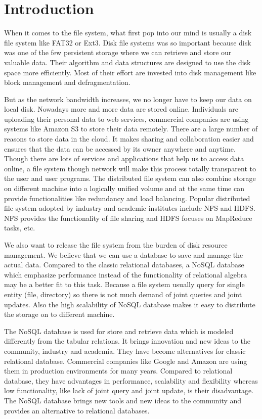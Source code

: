\chapter{Introduction}
\label{chap:intro}

    When it comes to the file system, what first pop into our mind is usually a disk file system like FAT32 or Ext3. Disk file systems was so important because disk was one of the few persistent storage where we can retrieve and store our valuable data. Their algorithm and data structures are designed to use the disk space more efficiently. Most of their effort are invested into disk management like block management and defragmentation. 

    But as the network bandwidth increases, we no longer have to keep our data on local disk. Nowadays more and more data are stored online. Individuals are uploading their personal data to web services, commercial companies are using systems like Amazon S3 to store their data remotely. There are a large number of reasons to store data in the cloud. It makes sharing and collaboration easier and ensures that the data can be accessed by its owner anywhere and anytime. Though there are lots of services and applications that help us to access data online, a file system though network will make this process totally transparent to the user and user programs. The distributed file system can also combine storage on different machine into a logically unified volume and at the same time can provide functionalities like redundancy and load balancing. Popular distributed file system adopted by industry and academic institutes include NFS and HDFS. NFS provides the functionality of file sharing and HDFS focuses on MapReduce tasks, etc.

    We also want to release the file system from the burden of disk resource management. We believe that we can use a database to save and manage the actual data. Compared to the classic relational databases, a NoSQL database which emphasize performance instead of the functionality of relational algebra may be a better fit to this task. Because a file system usually query for single entity (file, directory) so there is not much demand of joint queries and joint updates. Also the high scalability of NoSQL database makes it easy to distribute the storage on to different machine.

    The NoSQL database is used for store and retrieve data which is modeled differently from the tabular relations. It brings innovation and new ideas to the community, industry and academia. They have become alternatives for classic relational database. Commercial companies like Google and Amazon are using them in production environments for many years. Compared to relational database, they have advantages in performance, scalability and flexibility whereas low functionality, like lack of joint query and joint update, is their disadvantage. The NoSQL database brings new tools and new ideas to the community and provides an alternative to relational databases. 

